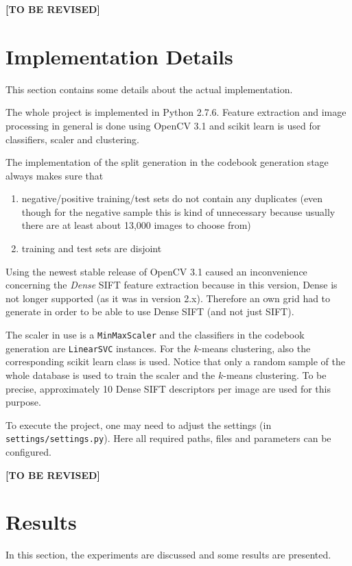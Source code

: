 \documentclass{vldb}
\newcommand{\tbr}{{\color{red}\textbf{[TO BE REVISED]}}}
\begin{document}
\tbr

\section{Implementation Details}
\label{sec:implementation-details}

This section contains some details about the actual implementation.

The whole project is implemented in Python 2.7.6. Feature extraction and image
processing in general is done using OpenCV 3.1 and scikit learn is used
for classifiers, scaler and clustering.

The implementation of the split generation in the codebook generation stage always
makes sure that
\begin{enumerate}
  \item negative/positive training/test sets do not contain any duplicates (even
    though for the negative sample this is kind of unnecessary because usually
    there are at least about 13,000 images to choose from)
  \item training and test sets are disjoint
\end{enumerate}

Using the newest stable release of OpenCV 3.1 caused an inconvenience concerning
the \emph{Dense} SIFT feature extraction because in this version, Dense is not
longer supported (as it was in version 2.x). Therefore an own grid had to generate
in order to be able to use Dense SIFT (and not just SIFT).

The scaler in use is a \texttt{MinMaxScaler} and the classifiers in the codebook
generation are \texttt{LinearSVC} instances. For the $k$-means clustering, also
the corresponding scikit learn class is used. Notice that only a random sample
of the whole database is used to train the scaler and the $k$-means clustering.
To be precise, approximately 10 Dense SIFT descriptors per image are used for this
purpose.

To execute the project, one may need to adjust the settings (in
\texttt{settings/settings.py}). Here all required paths, files and parameters
can be configured.

\tbr

\section{Results}
\label{sec:results}

In this section, the experiments are discussed and some results are presented.
\end{document}
